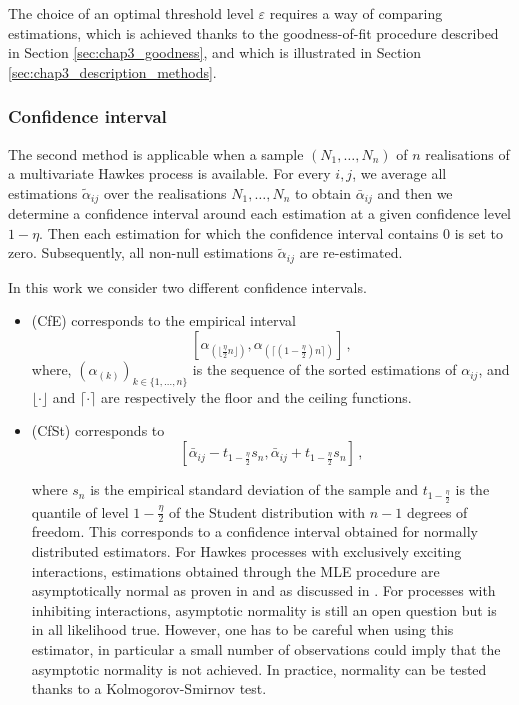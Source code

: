    The choice of an optimal threshold level $\varepsilon$ requires a way of comparing estimations, which is achieved thanks to the goodness-of-fit procedure described in Section \ref{sec:chap3_goodness},
   and which is illustrated in Section \ref{sec:chap3_description_methods}.
   
   \subsubsection{Confidence interval}\label{sec:chap3_confidence_interval}
   
   The second method is applicable when a sample $(N_1, \ldots, N_n)$ of $n$ realisations of a multivariate Hawkes process is available. For every $i,j$, we average all estimations $\tilde\alpha_{ij}$ over the realisations $N_1, \ldots, N_n$ to obtain $\bar\alpha_{ij}$ and then we determine a confidence interval around each estimation at a given confidence level $1-\eta$. Then each estimation for which the confidence interval contains $0$ is set to zero. Subsequently, all non-null estimations $\tilde\alpha_{ij}$ are re-estimated.
   
   In this work we consider two different confidence intervals. 
   \begin{itemize}
   \item (CfE) corresponds to the empirical interval
   \[
      \left[\alpha_{(\lfloor{\frac{\eta}{2} n}\rfloor)}, \alpha_{(\lceil (1-\frac{\eta}{2}) n \rceil)}\right]\,,
    \]
    where, $(\alpha_{(k)})_{k\in \{1, \ldots, n\}}$ is the sequence of the sorted estimations of $\alpha_{ij}$,
    and $\lfloor \cdot \rfloor$ and $\lceil \cdot \rceil$ are respectively the floor and the ceiling functions.
   \item (CfSt) corresponds to
   \[\left[\bar\alpha_{ij} - t_{1-\frac{\eta}{2}} s_n, \bar\alpha_{ij} + t_{1-\frac{\eta}{2}} s_n \right]\,,\]

   where $s_n$ is the empirical standard deviation of the sample and $t_{1-\frac{\eta}{2}}$ is the quantile of level $1-\frac{\eta}{2}$ of the Student distribution with $n-1$ degrees of freedom. 
   This corresponds to a confidence interval obtained for normally distributed estimators.
   For Hawkes processes with exclusively exciting interactions, estimations obtained through the MLE procedure are asymptotically normal as proven in \cite[Theorem 5]{Ogata1978} and as discussed in \textcite{Laub2014}.
   For processes with inhibiting interactions, 
   asymptotic normality is still an open question but is in all likelihood true.
   However, one has to be careful when using this estimator, in particular a small number of observations could imply that the asymptotic normality is not achieved. In practice, normality can be tested thanks to a Kolmogorov-Smirnov test.   
   
   \end{itemize}
   
